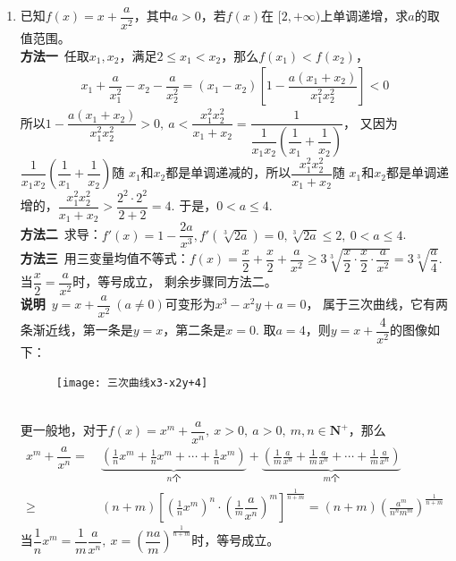 \begin{enumerate}[label={【\textbf{例\thechapter.\arabic*}】},
 leftmargin=\inteval{\myenumleftmargin}pt,
 itemsep=\inteval{\myenumitempsep}pt,
 itemindent=\inteval{\myenumitemindent}pt]
\item 已知$ f(x)=x+\dfrac{a}{x^2} $，其中$ a>0 $，若$ f(x) $在
$ [2,+\infty) $上单调递增，求$ a $的取值范围。 \\
\textbf{方法一}\ 任取$ x_1,x_2 $，满足$ 2\leq x_1<x_2 $，那么$ f(x_1)<f(x_2) $，
\begin{align*}
    x_1+\dfrac{a}{x_1^2}-x_2-\dfrac{a}{x_2^2} 
    =(x_1-x_2)\left[1-\dfrac{a(x_1+x_2)}{x_1^2x_2^2} \right] <0 
\end{align*} 
所以$ 1-\dfrac{a(x_1+x_2)}{x_1^2x_2^2}>0,\ a<\dfrac{x_1^2x_2^2}{x_1+x_2}=
\dfrac{1}{\dfrac{1}{x_1x_2}\left(\dfrac{1}{x_1}+\dfrac{1}{x_2}\right)} $，
又因为$ \dfrac{1}{x_1x_2}\left(\dfrac{1}{x_1}+\dfrac{1}{x_2}\right) $随
$ x_1 $和$ x_2 $都是单调递减的，所以$ \dfrac{x_1^2x_2^2}{x_1+x_2} $随
$ x_1 $和$ x_2 $都是单调递增的，$ \dfrac{x_1^2x_2^2}{x_1+x_2}>
\dfrac{2^2\cdot 2^2}{2+2}=4 $. 于是，$ 0<a\leq 4 $. \\
\textbf{方法二}\ 求导：$ f'(x)=1-\dfrac{2a}{x^3},f'\left(\sqrt[3]{
    2a} \right)=0,\sqrt[3]{2a}\leq 2,\ 0<a\leq 4 $. \smallskip \\
\textbf{方法三}\ 用三变量均值不等式：$ f(x)=\dfrac{x}{2}+\dfrac{x}{2}+\dfrac{a}{x^2}
\geq 3\sqrt[3]{\dfrac{x}{2}\cdot\dfrac{x}{2}\cdot \dfrac{a}{x^2}}=
3\sqrt[3]{\dfrac{a}{4}} $. 当$ \dfrac{x}{2}=\dfrac{a}{x^2} $时，等号成立，
剩余步骤同方法二。 \\
\textbf{说明}\ $ y=x+\dfrac{a}{x^2}\ (a\neq 0) $可变形为$ x^3-x^2y+a=0 $，
属于三次曲线，它有两条渐近线，第一条是$ y=x $，第二条是$ x=0 $. 
取$ a=4 $，则$ y=x+\dfrac{4}{x^2} $的图像如下：
\begin{figure}[h]
    \centering
    \texttt{[image: 三次曲线x3-x2y+4]}
\end{figure} \\
更一般地，对于$ f(x)=x^m+\dfrac{a}{x^n},\ x>0,\ a>0,\ m,n\in \textbf{N}^+ $，那么
\begin{align*}
    x^m+\dfrac{a}{x^n}=&\ \underbrace{\left(\frac{1}{n}x^m+\frac{1}{n}x^m+\cdots+
        \frac{1}{n}x^m \right)}_{n\text{个}}+
    \underbrace{\left(\frac{1}{m}\frac{a}{x^n}+\frac{1}{m}\frac{a}{x^n}
     +\cdots+ \frac{1}{m}\frac{a}{x^n} \right)}_{m\text{个}}  \\
    \geq &\ (n+m) \left[\left(\frac{1}{n}x^m\right)^n\cdot 
    \left(\frac{1}{m}\dfrac{a}{x^n}\right)^m\right]^{\frac{1}{n+m}} 
    =(n+m) \left(\frac{a^m}{n^nm^m}\right)^{\frac{1}{n+m}}
\end{align*}
当$ \dfrac{1}{n}x^m=\dfrac{1}{m}\dfrac{a}{x^n},\ 
x=\left(\dfrac{na}{m}\right)^{\frac{1}{n+m}} $时，等号成立。\\


\end{enumerate}
